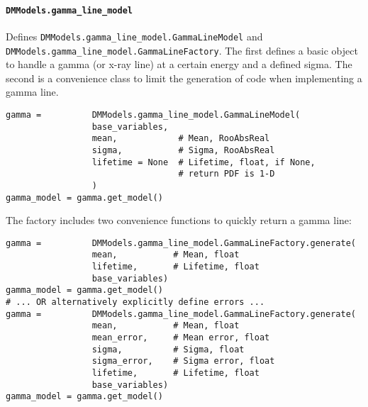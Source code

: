 			\paragraph{\lstinline!DMModels.gamma_line_model!}
Defines \lstinline!DMModels.gamma_line_model.GammaLineModel! and \lstinline!DMModels.gamma_line_model.GammaLineFactory!.  The
first defines a basic object to handle a gamma (or x-ray line) at a certain energy and a defined sigma.  The second is a 
convenience class to limit the generation of code when implementing a gamma line. 
				\begin{lstlisting}			
gamma =          DMModels.gamma_line_model.GammaLineModel(
                 base_variables,
                 mean,            # Mean, RooAbsReal
                 sigma,           # Sigma, RooAbsReal
                 lifetime = None  # Lifetime, float, if None, 
                                  # return PDF is 1-D
                 )
gamma_model = gamma.get_model()
				\end{lstlisting}				
The factory includes two convenience functions to quickly return a gamma line:
				\begin{lstlisting}			
gamma =          DMModels.gamma_line_model.GammaLineFactory.generate(
                 mean,           # Mean, float
                 lifetime,       # Lifetime, float
                 base_variables)
gamma_model = gamma.get_model()
# ... OR alternatively explicitly define errors ...
gamma =          DMModels.gamma_line_model.GammaLineFactory.generate(
                 mean,           # Mean, float
                 mean_error,     # Mean error, float
                 sigma,          # Sigma, float
                 sigma_error,    # Sigma error, float
                 lifetime,       # Lifetime, float
                 base_variables)
gamma_model = gamma.get_model()

				\end{lstlisting}				

